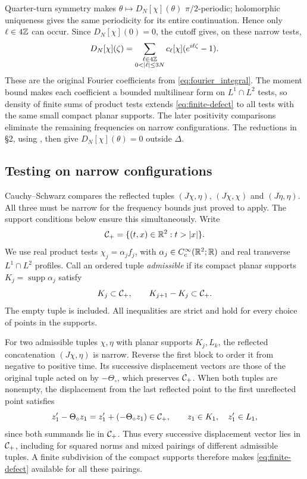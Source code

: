 
Quarter-turn symmetry makes $\theta\mapsto D_N[\chi](\theta)$
$\pi/2$-periodic;
holomorphic uniqueness gives the same periodicity for its entire
continuation. Hence only $\ell\in4\mathbb{Z}$ can occur. Since
$D_N[\chi](0)=0$, the cutoff gives, on these narrow tests,
\begin{equation}\label{eq:finite-defect}
 D_N[\chi](\zeta)
 =\sum_{\substack{\ell\in4\bbZ\\0<|\ell|\le3N}}
     c_\ell[\chi](e^{i\ell\zeta}-1).
\end{equation}
These are the original Fourier coefficients from
\eqref{eq:fourier_integral}. The moment bound makes each coefficient
a bounded multilinear form on $L^1\cap L^2$ tests, so density of finite sums
of product tests extends
\eqref{eq:finite-defect} to all tests with the same small compact planar
supports. The later positivity comparisons eliminate the remaining
frequencies on narrow configurations. The reductions in \S2, using
, then give $D_N[\chi](\theta)=0$ outside $\Delta$.


\subsection{Testing on narrow configurations}\label{subsec:narrow-testing}

Cauchy--Schwarz compares the reflected tuples $(J\chi,\eta)$,
$(J\chi,\chi)$ and $(J\eta,\eta)$. All three must be narrow for the
frequency bounds just proved to apply. The support conditions below
ensure this simultaneously. Write
\begin{equation}
 \mathcal{C}_+=\{(t,x)\in\mathbb{R}^2:t>|x|\}.
\end{equation}
We use real product tests $\chi_j=\alpha_jf_j$, with
$\alpha_j\in C_c^\infty(\mathbb{R}^2;\mathbb{R})$ and real transverse
$L^1\cap L^2$ profiles. Call an ordered tuple \emph{admissible} if its
compact planar supports $K_j=\operatorname{supp}\alpha_j$ satisfy
\begin{equation}\label{eq:admissible-supports}
 K_j\subset\mathcal{C}_+,\qquad K_{j+1}-K_j\subset\mathcal{C}_+.
\end{equation}
The empty tuple is included. All inequalities are strict and hold
for every choice of points in the supports.

For two admissible tuples $\chi,\eta$ with planar supports $K_j,L_k$,
the reflected concatenation
$(J\chi,\eta)$ is narrow. Reverse the first block to order it from
negative to positive time. Its successive displacement vectors are
those of the original tuple acted on by $-\Theta_\circ$, which
preserves $\mathcal{C}_+$. When both tuples are nonempty, the displacement
from the last reflected point to the first unreflected point satisfies
\begin{equation}\label{eq:narrow-crossing}
 z'_1-\Theta_\circ z_1=z'_1+(-\Theta_\circ z_1)\in\mathcal{C}_+,
 \qquad z_1\in K_1,\quad z'_1\in L_1,
\end{equation}
since both summands lie in $\mathcal{C}_+$. Thus every successive
displacement vector lies in $\mathcal{C}_+$, including for squared norms and mixed pairings
of different admissible tuples. A finite subdivision of the compact
supports therefore makes \eqref{eq:finite-defect} available for
all these pairings.

